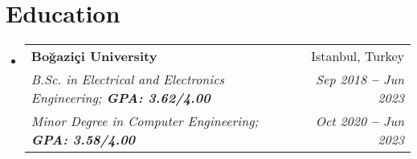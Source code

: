 \documentclass[letterpaper,11pt]{article}
\makeatletter
\newcommand{\resumeItem}[1]{
  \item\small{
    {#1 \vspace{-2pt}}
  }
}
\newcommand{\resumeSubheading}[4]{
  \vspace{-2pt}\item
    \begin{tabular*}{0.97\textwidth}[t]{l@{\extracolsep{\fill}}r}
      \textbf{#1} & #2 \\
      \textit{\small#3} & \textit{\small #4} \\
    \end{tabular*}\vspace{-7pt}
}
\newcommand{\resumeEducationHeading}[6]{
  \vspace{-2pt}\item
    \begin{tabular*}{0.97\textwidth}[t]{l@{\extracolsep{\fill}}r}
      \textbf{#1} & #2 \\
      \textit{\small#3} & \textit{\small #4} \\
      \textit{\small#5} & \textit{\small #6} \\
    \end{tabular*}\vspace{-5pt}
}
\newcommand{\resumeSubHeadingListStart}{\begin{itemize}[leftmargin=0.15in, label={}]}
\newcommand{\resumeSubHeadingListEnd}{\end{itemize}}
\newcommand{\resumeItemListStart}{\begin{itemize}}
\newcommand{\resumeItemListEnd}{\end{itemize}\vspace{-5pt}}
\makeatother
\begin{document}

\section{Education}
\vspace{3pt}
\resumeSubHeadingListStart
  
  \resumeEducationHeading
    {Boğaziçi University
    }{Istanbul, Turkey}
    {B.Sc. in Electrical and Electronics Engineering;   \textbf{GPA: 3.62/4.00}}{Sep 2018 \textbf{--} Jun 2023}
    {Minor Degree in Computer Engineering;
    \textbf{GPA: 3.58/4.00}}{Oct 2020 \textbf{--} Jun 2023}
  
  
\resumeSubHeadingListEnd








    



\end{document}
